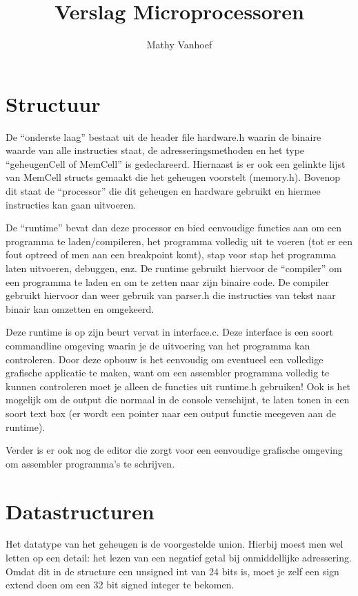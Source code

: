 \documentclass[a4paper,11pt]{article}
\author{Mathy Vanhoef}
\title{Verslag Microprocessoren}
\begin{document}
\maketitle

\section{Structuur}

De ``onderste laag'' bestaat uit de header file hardware.h waarin de binaire waarde van alle instructies staat, de adresseringsmethoden en het type ``geheugenCell of MemCell'' is gedeclareerd. Hiernaast is er ook een gelinkte lijst van MemCell structs gemaakt die het geheugen voorstelt (memory.h). Bovenop dit staat de ``processor'' die dit geheugen en hardware gebruikt en hiermee instructies kan gaan uitvoeren.

De ``runtime'' bevat dan deze processor en bied eenvoudige functies aan om een programma te laden/compileren, het programma volledig uit te voeren (tot er een fout optreed of men aan een breakpoint komt), stap voor stap het programma laten uitvoeren, debuggen, enz. De runtime gebruikt hiervoor de ``compiler'' om een programma te laden en om te zetten naar zijn binaire code. De compiler gebruikt hiervoor dan weer gebruik van parser.h die instructies van tekst naar binair kan omzetten en omgekeerd.

Deze runtime is op zijn beurt vervat in interface.c. Deze interface is een soort commandline omgeving waarin je de uitvoering van het programma kan controleren. Door deze opbouw is het eenvoudig om eventueel een volledige grafische applicatie te maken, want om een assembler programma volledig te kunnen controleren moet je alleen de functies uit runtime.h gebruiken! Ook is het mogelijk om de output die normaal in de console verschijnt, te laten tonen in een soort text box (er wordt een pointer naar een output functie meegeven aan de runtime).

Verder is er ook nog de editor die zorgt voor een eenvoudige grafische omgeving om assembler programma's te schrijven.

\section{Datastructuren}

Het datatype van het geheugen is de voorgestelde union. Hierbij moest men wel letten op een detail: het lezen van een negatief getal bij onmiddellijke adressering. Omdat dit in de structure een unsigned int van 24 bits is, moet je zelf een sign extend doen om een 32 bit signed integer te bekomen.
\end{document}

